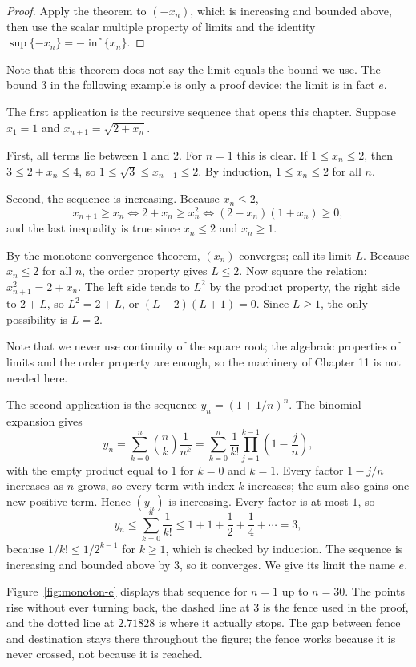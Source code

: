 \begin{proof}
Apply the theorem to $(-x_n)$, which is increasing and bounded above, then use the
scalar multiple property of limits and the identity
$\sup\{-x_n\}=-\inf\{x_n\}$.
\end{proof}

Note that this theorem does not say the limit equals the bound we use. The bound $3$
in the following example is only a proof device; the limit is in fact $e$.

The first application is the recursive sequence that opens this chapter. Suppose
$x_1=1$ and $x_{n+1}=\sqrt{2+x_n}$.

First, all terms lie between $1$ and $2$. For $n=1$ this is clear. If
$1 \le x_n \le 2$, then $3 \le 2+x_n \le 4$, so
$1 \le \sqrt{3} \le x_{n+1} \le 2$. By induction, $1 \le x_n \le 2$ for all $n$.

Second, the sequence is increasing. Because $x_n \le 2$,
\[
x_{n+1} \ge x_n \iff 2+x_n \ge x_n^2 \iff (2-x_n)(1+x_n) \ge 0,
\]
and the last inequality is true since $x_n \le 2$ and $x_n \ge 1$.

By the monotone convergence theorem, $(x_n)$ converges; call its limit $L$. Because
$x_n \le 2$ for all $n$, the order property gives $L \le 2$. Now square the relation:
$x_{n+1}^2=2+x_n$. The left side tends to $L^2$ by the product property, the right
side to $2+L$, so $L^2=2+L$, or $(L-2)(L+1)=0$. Since $L \ge 1$, the only
possibility is $L=2$.

Note that we never use continuity of the square root; the algebraic properties of
limits and the order property are enough, so the machinery of Chapter 11 is not
needed here.

The second application is the sequence $y_n=(1+1/n)^n$. The binomial expansion gives
\[
y_n = \sum_{k=0}^{n} \binom{n}{k}\frac{1}{n^k}
= \sum_{k=0}^{n} \frac{1}{k!}\prod_{j=1}^{k-1}\left(1-\frac{j}{n}\right),
\]
with the empty product equal to $1$ for $k=0$ and $k=1$. Every factor $1-j/n$
increases as $n$ grows, so every term with index $k$ increases; the sum also gains
one new positive term. Hence $(y_n)$ is increasing. Every factor is at most $1$, so
\[
y_n \le \sum_{k=0}^{n}\frac{1}{k!} \le 1+1+\frac12+\frac14+\cdots = 3,
\]
because $1/k! \le 1/2^{k-1}$ for $k \ge 1$, which is checked by induction. The
sequence is increasing and bounded above by $3$, so it converges. We give its limit
the name $e$.

Figure~\ref{fig:monoton-e} displays that sequence for $n=1$ up to $n=30$. The points
rise without ever turning back, the dashed line at $3$ is the fence used in the proof,
and the dotted line at $2.71828$ is where it actually stops. The gap between fence and
destination stays there throughout the figure; the fence works because it is never
crossed, not because it is reached.

